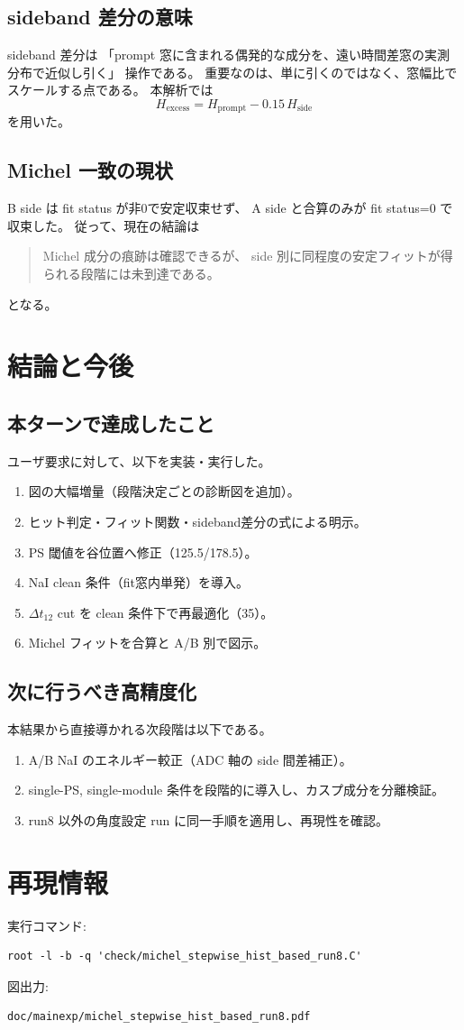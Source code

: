\documentclass[a4paper,11pt]{jsarticle}
\begin{document}
\subsection{sideband 差分の意味}
sideband 差分は
「prompt 窓に含まれる偶発的な成分を、遠い時間差窓の実測分布で近似し引く」
操作である。
重要なのは、単に引くのではなく、窓幅比でスケールする点である。
本解析では
\begin{equation}
H_{\mathrm{excess}}=H_{\mathrm{prompt}}-0.15\,H_{\mathrm{side}}
\end{equation}
を用いた。

\subsection{Michel 一致の現状}
B side は fit status が非0で安定収束せず、
A side と合算のみが fit status=0 で収束した。
従って、現在の結論は
\begin{quote}
Michel 成分の痕跡は確認できるが、
side 別に同程度の安定フィットが得られる段階には未到達である。
\end{quote}
となる。

\section{結論と今後}
\subsection{本ターンで達成したこと}
ユーザ要求に対して、以下を実装・実行した。
\begin{enumerate}
  \item 図の大幅増量（段階決定ごとの診断図を追加）。
  \item ヒット判定・フィット関数・sideband差分の式による明示。
  \item PS 閾値を谷位置へ修正（125.5/178.5）。
  \item NaI clean 条件（fit窓内単発）を導入。
  \item $\Delta t_{12}$ cut を clean 条件下で再最適化（35）。
  \item Michel フィットを合算と A/B 別で図示。
\end{enumerate}

\subsection{次に行うべき高精度化}
本結果から直接導かれる次段階は以下である。
\begin{enumerate}
  \item A/B NaI のエネルギー較正（ADC 軸の side 間差補正）。
  \item single-PS, single-module 条件を段階的に導入し、カスプ成分を分離検証。
  \item run8 以外の角度設定 run に同一手順を適用し、再現性を確認。
\end{enumerate}

\section*{再現情報}
実行コマンド:
\begin{verbatim}
root -l -b -q 'check/michel_stepwise_hist_based_run8.C'
\end{verbatim}
図出力:
\begin{verbatim}
doc/mainexp/michel_stepwise_hist_based_run8.pdf
\end{verbatim}
\end{document}
